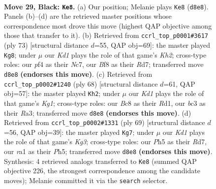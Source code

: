 \documentclass[11pt]{article}
\begin{document}
\clearpage

\begin{figure}[p]\centering
\begin{subfigure}{0.46\textwidth}\centering
\resizebox{\linewidth}{!}{%
\newchessgame
\chessboard[
  setfen={1rbk1b2/p1p2p1r/P1p3p1/2P4p/1P3P1P/2B5/8/RN2K2R b Q - 6 29},
  showmover=false,
  pgfstyle=straightmove, color=movearrow, markmove={d8-e8}
]}
\caption{}
\end{subfigure}\hfill
\begin{subfigure}{0.46\textwidth}\centering
\resizebox{\linewidth}{!}{%
\newchessgame
\chessboard[
  setfen={1r2b3/2nr2pk/2p4p/R1P2p1P/1P1PpP2/2N1B2P/5K2/1R6 b - - 7 37},
  showmover=false,
  pgfstyle=straightmove, color=movearrow, markmove={h7-g8}
]}
\caption{}
\end{subfigure}
\\[4pt]
\begin{subfigure}{0.46\textwidth}\centering
\resizebox{\linewidth}{!}{%
\newchessgame
\chessboard[
  setfen={rr4k1/6p1/4bp2/P1np3p/2p5/R1B1PPPP/8/3R1BK1 w - - 4 35},
  showmover=false,
  pgfstyle=straightmove, color=movearrow, markmove={g1-h2}
]}
\caption{}
\end{subfigure}\hfill
\begin{subfigure}{0.46\textwidth}\centering
\resizebox{\linewidth}{!}{%
\newchessgame
\chessboard[
  setfen={1r6/2prbp2/6k1/1P2p2p/b3P1p1/P3BPP1/1R2B1K1/1R6 b - - 0 35},
  showmover=false,
  pgfstyle=straightmove, color=movearrow, markmove={g6-g7}
]}
\caption{}
\end{subfigure}
\caption{\textbf{Move 29, Black: \texttt{Ke8}.} (a) Our position; Melanie plays \texttt{Ke8} (\texttt{d8e8}). Panels (b)--(d) are the retrieved master positions whose correspondence most drove this move (highest QAP objective among those that transfer to it). (b) Retrieved from \texttt{ccrl\_top\_p0001\#3617} (ply 73) [structural distance $d$=55, QAP obj=69]: the master played \texttt{Kg8}; under $\mu$ our \emph{Kd1} plays the role of that game's \emph{Kh2}; cross-type roles: our \emph{p}f4 as their \emph{N}c7, our \emph{B}f8 as their \emph{R}d7; transferred move \texttt{d8e8} \textbf{(endorses this move)}. (c) Retrieved from \texttt{ccrl\_top\_p0002\#1240} (ply 68) [structural distance $d$=61, QAP obj=57]: the master played \texttt{Kh2}; under $\mu$ our \emph{Kd1} plays the role of that game's \emph{Kg1}; cross-type roles: our \emph{B}c8 as their \emph{R}d1, our \emph{b}c3 as their \emph{R}a3; transferred move \texttt{d8e8} \textbf{(endorses this move)}. (d) Retrieved from \texttt{ccrl\_top\_p0002\#1331} (ply 69) [structural distance $d$=56, QAP obj=39]: the master played \texttt{Kg7}; under $\mu$ our \emph{Kd1} plays the role of that game's \emph{Kg3}; cross-type roles: our \emph{P}h5 as their \emph{R}d7, our \emph{r}a1 as their \emph{P}h5; transferred move \texttt{d8e8} \textbf{(endorses this move)}. Synthesis: 4 retrieved analogs transferred to \texttt{Ke8} (summed QAP objective 226, the strongest correspondence among the candidate moves); Melanie committed it via the \texttt{search} selector.}
\label{fig:thought-m57}
\end{figure}
\end{document}
